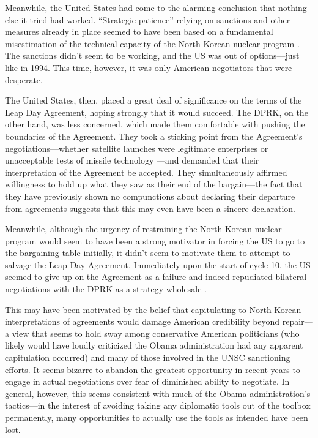 Meanwhile, the United States had come to the alarming conclusion that nothing else it tried had worked. ``Strategic patience'' relying on sanctions and other measures already in place seemed to have been based on a fundamental misestimation of the technical capacity of the North Korean nuclear program \cite{snyder2}. The sanctions didn't seem to be working, and the US was out of options---just like in 1994. This time, however, it was only American negotiators that were desperate.

The United States, then, placed a great deal of significance on the terms of the Leap Day Agreement, hoping strongly that it would succeed. The DPRK, on the other hand, was less concerned, which made them comfortable with pushing the boundaries of the Agreement. They took a sticking point from the Agreement's negotiations---whether satellite launches were legitimate enterprises or unacceptable tests of missile technology \cite{delury}---and demanded that their interpretation of the Agreement be accepted. They simultaneously affirmed willingness to hold up what they saw as their end of the bargain---the fact that they have previously shown no compunctions about declaring their departure from agreements suggests that this may even have been a sincere declaration.

Meanwhile, although the urgency of restraining the North Korean nuclear program would seem to have been a strong motivator in forcing the US to go to the bargaining table initially, it didn't seem to motivate them to attempt to salvage the Leap Day Agreement. Immediately upon the start of cycle 10, the US seemed to give up on the Agreement as a failure and indeed repudiated bilateral negotiations with the DPRK as a strategy wholesale \cite{delury}.

This may have been motivated by the belief that capitulating to North Korean interpretations of agreements would damage American credibility beyond repair---a view that seems to hold sway among conservative American politicians (who likely would have loudly criticized the Obama administration had any apparent capitulation occurred) and many of those involved in the UNSC sanctioning efforts. It seems bizarre to abandon the greatest opportunity in recent years to engage in actual negotiations over fear of diminished ability to negotiate. In general, however, this seems consistent with much of the Obama administration's tactics---in the interest of avoiding taking any diplomatic tools out of the toolbox permanently, many opportunities to actually use the tools as intended have been lost.

